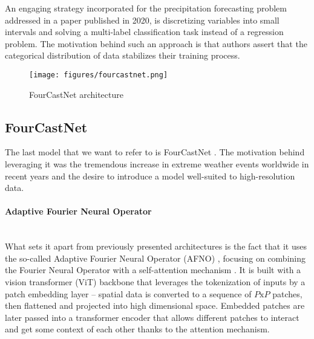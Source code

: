  An engaging strategy incorporated for the precipitation forecasting problem addressed in a paper published in 2020, is discretizing variables into small intervals and solving a multi-label classification task instead of a regression problem. The motivation behind such an approach is that authors assert that the categorical distribution of data stabilizes their training process. 

\begin{figure}[!ht]
    \centering
    \texttt{[image: figures/fourcastnet.png]}
    \caption{FourCastNet architecture \cite{pathak2022fourcastnet}}
    \label{fig:fourcastnet}
\end{figure}

\subsection{FourCastNet} \label{sec:fourcastnet}
The last model that we want to refer to is FourCastNet \cite{pathak2022fourcastnet}. The motivation behind leveraging it was the tremendous increase in extreme weather events worldwide in recent years and the desire to introduce a model well-suited to high-resolution data.

\paragraph{Adaptive Fourier Neural Operator} \mbox{} \\
\noindent What sets it apart from previously presented architectures is the fact that it uses the so-called Adaptive Fourier Neural Operator (AFNO) \cite{guibas2022adaptive}, focusing on combining the Fourier Neural Operator \cite{li2021fourier} with a self-attention mechanism \cite{vaswani2023attention}.
It is built with a vision transformer (ViT) backbone \cite{dosovitskiy2021image} that leverages the tokenization of inputs by a patch embedding layer -- spatial data is converted to a sequence of $P\text{x}P$ patches, then flattened and projected into high dimensional space.
Embedded patches are later passed into a transformer encoder that allows different patches to interact and get some context of each other thanks to the attention mechanism.

